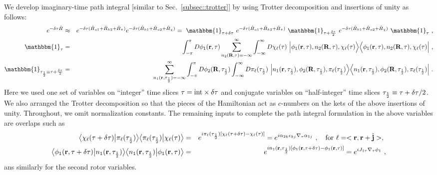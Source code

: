 We develop imaginary-time path integral [similar to Sec.~\ref{subsec::trotter}] by using Trotter decomposition and insertions of unity as follows:
\begin{eqnarray*}
e^{-\delta\tau \hat{H}} &\approx& e^{-\delta\tau (\hat{H}_{u1} + \hat{H}_{h2} + \hat{H}_\pi)} e^{-\delta\tau (\hat{H}_{h1} + \hat{H}_{u2} + \hat{H}_\chi)}
= ~\mathbbm{1}_{\tau + \delta\tau}~ e^{-\delta\tau (\hat{H}_{u1} + \hat{H}_{h2} + \hat{H}_\pi)} ~\mathbbm{1}_{\tau + \frac{\delta\tau}{2}}~ e^{-\delta\tau (\hat{H}_{h1} + \hat{H}_{u2} + \hat{H}_\chi)} ~\mathbbm{1}_{\tau} ~,\\
\mathbbm{1}_{\tau} &=&
\int_{-\pi}^\pi D\phi_1(\br, \tau)
\sum_{n_2(\bR, \tau) = -\infty}^\infty
\int_{-\infty}^\infty D\chi_\ell(\tau) ~
\Big|   \phi_1(\br, \tau), n_2(\bR, \tau), \chi_\ell(\tau) \Big\ra
\Big\la \phi_1(\br, \tau), n_2(\bR, \tau), \chi_\ell(\tau) \Big| ~,\\
\mathbbm{1}_{\tau_\half \equiv \tau + \frac{\delta\tau}{2}} &=&
\sum_{n_1(\br, \tau_\half) = -\infty}^\infty
\int_{-\pi}^\pi D\phi_2(\bR, \tau_\half) 
\int_{-\infty}^\infty D\pi_\ell(\tau_\half) ~
\Big|   n_1(\br, \tau_\half), \phi_2(\bR, \tau_\half), \pi_\ell(\tau_\half) \Big\ra
\Big\la n_1(\br, \tau_\half), \phi_2(\bR, \tau_\half), \pi_\ell(\tau_\half) \Big| ~.
\end{eqnarray*}
Here we used one set of variables on ``integer'' time slices $\tau = {\rm int} \times \delta\tau$ and conjugate variables on ``half-integer'' time slices $\tau_{\frac{1}{2}} \equiv \tau + \delta\tau/2$.  We also arranged the Trotter decomposition so that the pieces of the Hamiltonian act as $c$-numbers on the kets of the above insertions of unity.  Throughout, we omit normalization constants.  The remaining inputs to complete the path integral formulation in the above variables are overlaps such as
\begin{eqnarray}
\big\langle \chi_\ell(\tau + \delta\tau) \big| \pi_\ell(\tau_{\frac{1}{2}}) \big\rangle
\big\langle \pi_\ell(\tau_{\frac{1}{2}}) \big| \chi_\ell(\tau) \big\rangle &=& e^{i \pi_\ell(\tau_{\frac{1}{2}}) [\chi_\ell(\tau + \delta\tau) - \chi_\ell(\tau)]}
= e^{i \alpha_{2k} \epsilon_{kj} \nabla_\tau \alpha_{1j}} ~,
\quad {\rm for~} \ell = <{\bf r}, {\bf r}+\hat{{\bf j}}>, ~ \\
\big\langle \phi_1({\bf r}, \tau + \delta\tau) \big| n_1({\bf r}, \tau_{\frac{1}{2}}) \big\rangle
\big\langle n_1({\bf r}, \tau_{\frac{1}{2}}) \big| \phi_1({\bf r}, \tau) \big\rangle &=&
e^{i n_1({\bf r}, \tau_{\frac{1}{2}}) [\phi_1({\bf r}, \tau + \delta\tau) - \phi_1({\bf r}, \tau)]}
= e^{i J_{1\tau} \nabla_\tau \phi_1} ~,
\end{eqnarray}
ans similarly for the second rotor variables.

